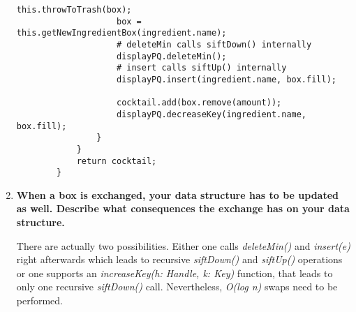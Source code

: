 \begin{enumerate}
\begin{lstlisting}[caption=The function MixDrink( recipe )]
					this.throwToTrash(box);
					box = this.getNewIngredientBox(ingredient.name);
					# deleteMin calls siftDown() internally
					displayPQ.deleteMin();
					# insert calls siftUp() internally
					displayPQ.insert(ingredient.name, box.fill);
					
					cocktail.add(box.remove(amount));
					displayPQ.decreaseKey(ingredient.name, box.fill);
				}
			}
			return cocktail;
		}
	\end{lstlisting}

	\item \textbf{When a box is exchanged, your data structure has to be updated as well. Describe what consequences the exchange has on your data structure.}
	
	There are actually two possibilities. Either one calls \textit{deleteMin()} and \textit{insert(e)} right afterwards which leads to recursive \textit{siftDown()} and \textit{siftUp()} operations or one supports an \textit{increaseKey(h: Handle, k: Key)} function, that leads to only one recursive \textit{siftDown()} call. Nevertheless, \textit{O(log n)} swaps need to be performed. 
	
\end{enumerate}
